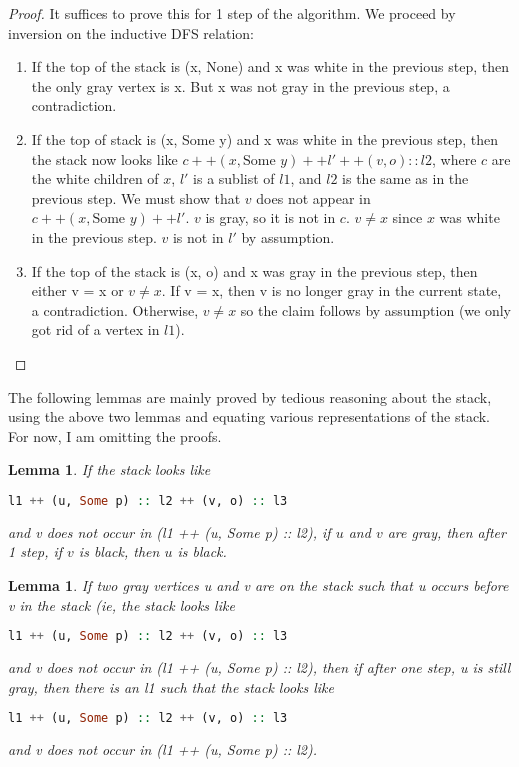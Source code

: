 \documentclass{article}
\newtheorem{lemma}[theorem]{Lemma}
\begin{document}
\begin{proof}
It suffices to prove this for 1 step of the algorithm. We proceed by inversion on the inductive DFS relation:
\begin{enumerate}
\item
If the top of the stack is (x, None) and x was white in the previous step, then the only gray vertex is x. But x was not gray in the previous step, a contradiction.
\item
If the top of stack is (x, Some y) and x was white in the previous step, then the stack now looks like $c ++ (x, \text{Some }y) ++ l' ++ (v, o) :: l2$, where $c$ are the white children of $x$, $l'$ is a sublist of $l1$, and $l2$ is the same as in the previous step. We must show that $v$ does not appear in $c ++ (x, \text{Some }y) ++ l'$. $v$ is gray, so it is not in $c$. $v \neq x$ since $x$ was white in the previous step. $v$ is not in $l'$ by assumption.
\item
If the top of the stack is (x, o) and x was gray in the previous step, then either v = x or $v\neq x$. If v = x, then v is no longer gray in the current state, a contradiction. Otherwise, $v \neq x$ so the claim follows by assumption (we only got rid of a vertex in $l1$).
\end{enumerate}
\end{proof}
The following lemmas are mainly proved by tedious reasoning about the stack, using the above two lemmas and equating various representations of the stack. For now, I am omitting the proofs.
\begin{lemma}
If the stack looks like
\begin{lstlisting}[language=Haskell]
l1 ++ (u, Some p) :: l2 ++ (v, o) :: l3
\end{lstlisting}
and v does not occur in (l1 ++ (u, Some p) :: l2),
if $u$ and $v$ are gray, then after 1 step, if $v$ is black, then $u$ is black.
\end{lemma}
\begin{lemma}
If two gray vertices u and v are on the stack such that u occurs before v in the stack (ie, the stack looks like 
\begin{lstlisting}[language=Haskell]
l1 ++ (u, Some p) :: l2 ++ (v, o) :: l3
\end{lstlisting}
and v does not occur in (l1 ++ (u, Some p) :: l2), then if after one step, u is still gray, then there is an l1 such that the stack looks like
\begin{lstlisting}[language=Haskell]
l1 ++ (u, Some p) :: l2 ++ (v, o) :: l3
\end{lstlisting}
and v does not occur in (l1 ++ (u, Some p) :: l2).
\end{lemma}
\end{document}
